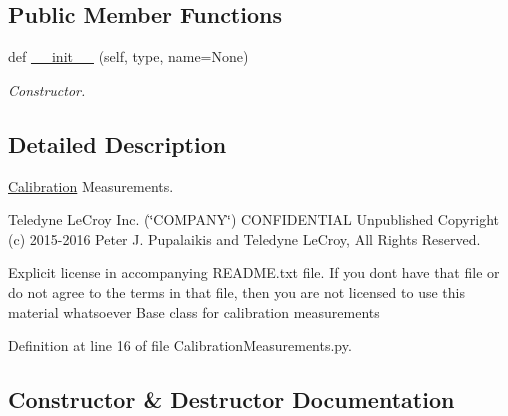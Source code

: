\subsection*{Public Member Functions}
\begin{DoxyCompactItemize}
\item 
def \hyperlink{classSignalIntegrity_1_1Measurement_1_1Calibration_1_1CalibrationMeasurements_1_1CalibrationMeasurement_a1ddf400813e458d6de6ee54246f050e7}{\+\_\+\+\_\+init\+\_\+\+\_\+} (self, type, name=None)
\begin{DoxyCompactList}\small\item\em Constructor. \end{DoxyCompactList}\end{DoxyCompactItemize}


\subsection{Detailed Description}
\hyperlink{namespaceSignalIntegrity_1_1Measurement_1_1Calibration_1_1Calibration}{Calibration} Measurements. 

Teledyne Le\+Croy Inc. (\char`\"{}\+C\+O\+M\+P\+A\+N\+Y\char`\"{}) C\+O\+N\+F\+I\+D\+E\+N\+T\+I\+AL Unpublished Copyright (c) 2015-\/2016 Peter J. Pupalaikis and Teledyne Le\+Croy, All Rights Reserved.

Explicit license in accompanying R\+E\+A\+D\+M\+E.\+txt file. If you don\textquotesingle{}t have that file or do not agree to the terms in that file, then you are not licensed to use this material whatsoever Base class for calibration measurements 

Definition at line 16 of file Calibration\+Measurements.\+py.



\subsection{Constructor \& Destructor Documentation}
\mbox{\label{classSignalIntegrity_1_1Measurement_1_1Calibration_1_1CalibrationMeasurements_1_1CalibrationMeasurement_a1ddf400813e458d6de6ee54246f050e7}} 

